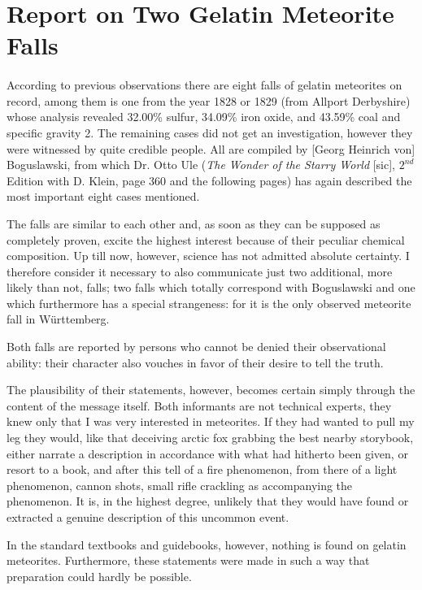 \documentclass[a4paper, 12pt, oneside]{article}
\begin{document}
\section{Report on Two Gelatin Meteorite Falls}
\paragraph{}
According to previous observations there are eight falls of gelatin meteorites on record, among them is one from the year 1828 or 1829 (from Allport Derbyshire) whose analysis revealed 32.00\% sulfur, 34.09\% iron oxide, and 43.59\% coal and specific gravity 2. The remaining cases did not get an investigation, however they were witnessed by quite credible people. All are compiled by [Georg Heinrich von] Boguslawski, from which Dr. Otto Ule (\emph{The Wonder of the Starry World} [sic], $2^{nd}$ Edition with D. Klein, page 360 and the following pages) has again described the most important eight cases mentioned.

The falls are similar to each other and, as soon as they can be supposed as completely proven, excite the highest interest because of their peculiar chemical composition. Up till now, however, science has not admitted absolute certainty. I therefore consider it necessary to also communicate just two additional, more likely than not, falls; two falls which totally correspond with Boguslawski and one which furthermore has a special strangeness: for it is the only observed meteorite fall in Württemberg.

Both falls are reported by persons who cannot be denied their observational ability: their character also vouches in favor of their desire to tell the truth.

The plausibility of their statements, however, becomes certain simply through the content of the message itself. Both informants are not technical experts, they knew only that I was very interested in meteorites. If they had wanted to pull my leg they would, like that deceiving arctic fox grabbing the best nearby storybook, either narrate a description in accordance with what had hitherto been given, or resort to a book, and after this tell of a fire phenomenon, from there of a light phenomenon, cannon shots, small rifle crackling as accompanying the phenomenon. It is, in the highest degree, unlikely that they would have found or extracted a genuine description of this uncommon event.

In the standard textbooks and guidebooks, however, nothing is found on gelatin meteorites. Furthermore, these statements were made in such a way that preparation could hardly be possible.
\end{document}
